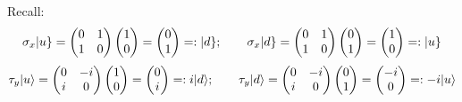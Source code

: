 \documentclass[solutions.tex]{subfiles}
\begin{document}
Recall:
\[
	\sigma_x|u\} = \begin{pmatrix}
		0 & 1 \\
		1 & 0 \\
	\end{pmatrix}\begin{pmatrix} 1 \\ 0 \\ \end{pmatrix} =
	\begin{pmatrix} 0 \\ 1 \\ \end{pmatrix} =: |d\};\qquad
	\sigma_x|d\} = \begin{pmatrix}
		0 & 1 \\
		1 & 0 \\
	\end{pmatrix}\begin{pmatrix} 0 \\ 1 \\ \end{pmatrix} =
	\begin{pmatrix} 1 \\ 0 \\ \end{pmatrix} =: |u\}
\]
\[
	\tau_y|u\rangle = \begin{pmatrix}
		0 & -i \\
		i & 0 \\
	\end{pmatrix}\begin{pmatrix} 1 \\ 0 \\ \end{pmatrix} =
	\begin{pmatrix} 0 \\ i \\ \end{pmatrix} =: i|d\rangle;\qquad
	\tau_y|d\rangle = \begin{pmatrix}
		0 & -i \\
		i & 0 \\
	\end{pmatrix}\begin{pmatrix} 0 \\ 1 \\ \end{pmatrix} =
	\begin{pmatrix} -i \\ 0 \\ \end{pmatrix} =: -i|u\rangle
\]
\end{document}
